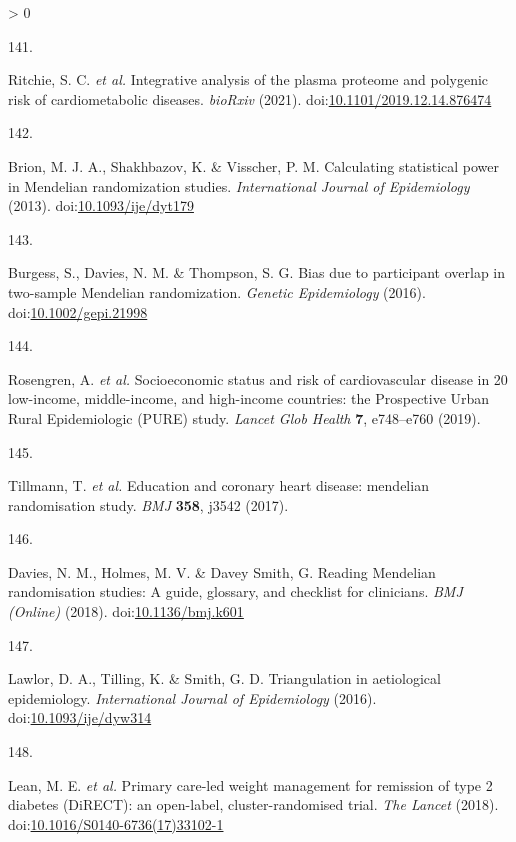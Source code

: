 \documentclass[11pt,twoside]{bristolthesis}
\newlength{\cslhangindent}
\newlength{\csllabelwidth}
\newenvironment{CSLReferences}[2] %
 {%
  \setlength{\parindent}{0pt}
  \ifodd #1 \everypar{\setlength{\hangindent}{\cslhangindent}}\ignorespaces\fi
  \ifnum #2 > 0
  \setlength{\parskip}{#2\baselineskip}
  \fi
 }%
 {}
\newcommand{\CSLLeftMargin}[1]{\parbox[t]{\csllabelwidth}{#1}}
\newcommand{\CSLRightInline}[1]{\parbox[t]{\linewidth - \csllabelwidth}{#1}\break}
\begin{document}
\begin{CSLReferences}{0}{0}
\leavevmode\hypertarget{ref-Ritchie2019}{}%
\CSLLeftMargin{141. }
\CSLRightInline{Ritchie, S. C. \emph{et al.} {Integrative analysis of the plasma proteome and polygenic risk of cardiometabolic diseases}. \emph{bioRxiv} (2021). doi:\href{https://doi.org/10.1101/2019.12.14.876474}{10.1101/2019.12.14.876474}}

\leavevmode\hypertarget{ref-Brion2013}{}%
\CSLLeftMargin{142. }
\CSLRightInline{Brion, M. J. A., Shakhbazov, K. \& Visscher, P. M. {Calculating statistical power in Mendelian randomization studies}. \emph{International Journal of Epidemiology} (2013). doi:\href{https://doi.org/10.1093/ije/dyt179}{10.1093/ije/dyt179}}

\leavevmode\hypertarget{ref-Burgess2016}{}%
\CSLLeftMargin{143. }
\CSLRightInline{Burgess, S., Davies, N. M. \& Thompson, S. G. {Bias due to participant overlap in two-sample Mendelian randomization}. \emph{Genetic Epidemiology} (2016). doi:\href{https://doi.org/10.1002/gepi.21998}{10.1002/gepi.21998}}

\leavevmode\hypertarget{ref-Rosengren2019}{}%
\CSLLeftMargin{144. }
\CSLRightInline{Rosengren, A. \emph{et al.} {Socioeconomic status and risk of cardiovascular disease in 20 low-income, middle-income, and high-income countries: the Prospective Urban Rural Epidemiologic (PURE) study}. \emph{Lancet Glob Health} \textbf{7}, e748--e760 (2019).}

\leavevmode\hypertarget{ref-Tillmann2017}{}%
\CSLLeftMargin{145. }
\CSLRightInline{Tillmann, T. \emph{et al.} {Education and coronary heart disease: mendelian randomisation study}. \emph{BMJ} \textbf{358}, j3542 (2017).}

\leavevmode\hypertarget{ref-Davies2018}{}%
\CSLLeftMargin{146. }
\CSLRightInline{Davies, N. M., Holmes, M. V. \& Davey Smith, G. {Reading Mendelian randomisation studies: A guide, glossary, and checklist for clinicians}. \emph{BMJ (Online)} (2018). doi:\href{https://doi.org/10.1136/bmj.k601}{10.1136/bmj.k601}}

\leavevmode\hypertarget{ref-Lawlor2016}{}%
\CSLLeftMargin{147. }
\CSLRightInline{Lawlor, D. A., Tilling, K. \& Smith, G. D. {Triangulation in aetiological epidemiology}. \emph{International Journal of Epidemiology} (2016). doi:\href{https://doi.org/10.1093/ije/dyw314}{10.1093/ije/dyw314}}

\leavevmode\hypertarget{ref-Lean2018}{}%
\CSLLeftMargin{148. }
\CSLRightInline{Lean, M. E. \emph{et al.} {Primary care-led weight management for remission of type 2 diabetes (DiRECT): an open-label, cluster-randomised trial}. \emph{The Lancet} (2018). doi:\href{https://doi.org/10.1016/S0140-6736(17)33102-1}{10.1016/S0140-6736(17)33102-1}}


\end{CSLReferences}
\end{document}
